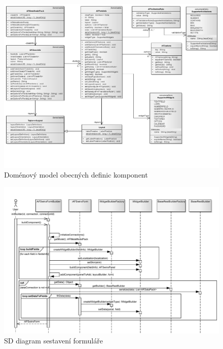 \documentclass[11pt,twoside,a4paper]{book}
\begin{document}
\begin{figure}
\includegraphics[angle=270]{images/metaModelFinal}
\caption{Doménový model obecných definic komponent}
\label{img:finalModel}
\end{figure}

\begin{figure}
\includegraphics[angle=270]{images/sdDiagram}
\caption{SD diagram sestavení formuláře}
\label{img:sdDiagram}
\end{figure}	
\end{document}
